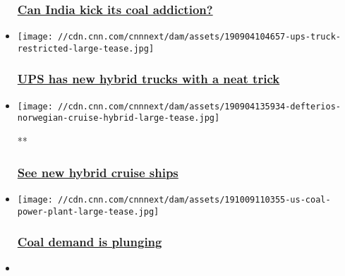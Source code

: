 \begin{itemize}
  \hypertarget{can-india-kick-its-coal-addiction}{%
  \subsubsection{\texorpdfstring{\href{/2019/07/11/business/india-energy-coal/index.html}{Can
  India kick its coal
  addiction?}}{Can India kick its coal addiction?}}\label{can-india-kick-its-coal-addiction}}
\item
  \href{/2019/09/04/tech/ups-hybrid-truck-trnd/index.html}{}

  \texttt{[image: //cdn.cnn.com/cnnnext/dam/assets/190904104657-ups-truck-restricted-large-tease.jpg]}

  \hypertarget{ups-has-new-hybrid-trucks-with-a-neat-trick}{%
  \subsubsection{\texorpdfstring{\href{/2019/09/04/tech/ups-hybrid-truck-trnd/index.html}{UPS
  has new hybrid trucks with a neat
  trick}}{UPS has new hybrid trucks with a neat trick}}\label{ups-has-new-hybrid-trucks-with-a-neat-trick}}
\item
  \href{/videos/business/2019/09/04/norway-hybrid-cruise-ship-defterios-pkg-vpx.cnn}{}

  \texttt{[image: //cdn.cnn.com/cnnnext/dam/assets/190904135934-defterios-norwegian-cruise-hybrid-large-tease.jpg]}

  **

  \hypertarget{see-new-hybrid-cruise-ships}{%
  \subsubsection{\texorpdfstring{\href{/videos/business/2019/09/04/norway-hybrid-cruise-ship-defterios-pkg-vpx.cnn}{See
  new hybrid cruise
  ships}}{See new hybrid cruise ships}}\label{see-new-hybrid-cruise-ships}}
\item
  \href{/2019/10/10/business/coal-power-trump/index.html}{}

  \texttt{[image: //cdn.cnn.com/cnnnext/dam/assets/191009110355-us-coal-power-plant-large-tease.jpg]}

  \hypertarget{coal-demand-is-plunging}{%
  \subsubsection{\texorpdfstring{\href{/2019/10/10/business/coal-power-trump/index.html}{Coal
  demand is
  plunging}}{Coal demand is plunging}}\label{coal-demand-is-plunging}}
\item
  \href{/2019/10/08/business/german-beer-renewable-energy/index.html}{}


\end{itemize}

